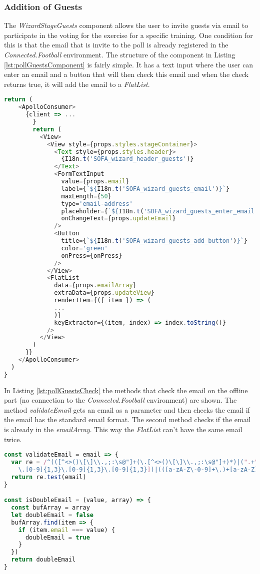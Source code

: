 \subsubsection{Addition of Guests}
\label{sssec:poll_guests}
The \textit{WizardStageGuests} component allows the user to invite guests via email to participate in the voting for the exercise for a specific training. One condition for this is that the email that is invite to the poll is already registered in the \textit{Connected.Football} environment. 
\newline
The structure of the component in Listing \ref{lst:pollGuestsComponent} is fairly simple. It has a text input where the user can enter an email and a button that will then check this email and when the check returns true, it will add the email to a \textit{FlatList}. 
\begin{lstlisting}[language=javascript, caption=Simplified Guest Component, label=lst:pollGuestsComponent]
return (
    <ApolloConsumer>
      {client => ...
        }
        return (
          <View>
            <View style={props.styles.stageContainer}>
              <Text style={props.styles.header}>
                {I18n.t('SOFA_wizard_header_guests')}
              </Text>
              <FormTextInput
                value={props.email}
                label={`${I18n.t('SOFA_wizard_guests_email')}`}
                maxLength={50}
                type='email-address'
                placeholder={`${I18n.t('SOFA_wizard_guests_enter_email')}`}
                onChangeText={props.updateEmail}
              />
              <Button
                title={`${I18n.t('SOFA_wizard_guests_add_button')}`}
                color='green'
                onPress={onPress}
              />
            </View>
            <FlatList
              data={props.emailArray}
              extraData={props.updateView}
              renderItem={({ item }) => (
              ...
              )}
              keyExtractor={(item, index) => index.toString()}
            />
          </View>
        )
      }}
    </ApolloConsumer>
  )
}
\end{lstlisting}
In Listing \ref{lst:pollGuestsCheck} the methods that check the email on the offline part (no connection to the \textit{Connected.Football} environment) are shown. The method \textit{validateEmail} gets an email as a parameter and then checks the email if the email has the standard email format. The second method checks if the email is already in the \textit{emailArray}. This way the \textit{FlatList} can't have the same email twice.
\begin{lstlisting}[language=javascript, caption=Check E-Mail Methods, label=lst:pollGuestsCheck]
const validateEmail = email => {
  var re = /^(([^<>()\[\]\\.,;:\s@"]+(\.[^<>()\[\]\\.,;:\s@"]+)*)|(".+"))@((\[[0-9]{1,3}
    \.[0-9]{1,3}\.[0-9]{1,3}\.[0-9]{1,3}])|(([a-zA-Z\-0-9]+\.)+[a-zA-Z]{2,}))$/
  return re.test(email)
}

const isDoubleEmail = (value, array) => {
  const bufArray = array
  let doubleEmail = false
  bufArray.find(item => {
    if (item.email === value) {
      doubleEmail = true
    }
  })
  return doubleEmail
}
\end{lstlisting}

